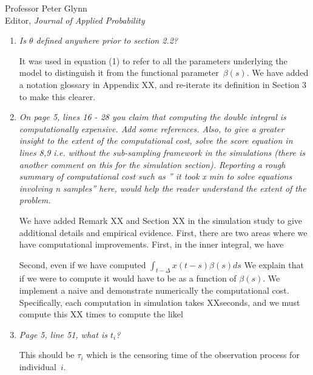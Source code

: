 \documentclass[11pt]{letter} %
\begin{document}
\begin{letter}{Professor
	Peter Glynn\\
	Editor, {\em Journal of Applied Probability}}
\begin{enumerate}
\vspace{5mm}
The key point raised on page 4 (now in Appendix XX), is that if $\epsilon(t)$ is not equivalently zero, your model assumes risk of an event at time $t$ depends on both the current and future measurements of the process ${\bf x}_i$. We argue this is not sensible since current risk should not depend on future risk and thus set $\epsilon(t) = 0$.
\vspace{5mm}

\item  {\it Is $\theta$ defined anywhere prior to section 2.2?}

\vspace{5mm}
It was used in equation (1) to refer to all the parameters underlying the model to distinguish it from the functional parameter~$\beta (s)$. We have added a notation glossary in Appendix XX, and re-iterate its definition in Section 3 to make this clearer.
\vspace{5mm}

\item {\it On page 5, lines 16 - 28 you claim that computing the double integral is computationally expensive. Add some references. Also, to give a greater insight to the extent of the computational cost, solve the score equation in lines 8,9 i.e. without the sub-sampling framework in the simulations (there is another comment on this for the simulation section). Reporting a rough summary of computational cost such as ” it took x min to solve equations involving n samples” here, would help the reader understand
the extent of the problem.}

\vspace{5mm}
We have added Remark XX and Section XX in the simulation study to give additional details and empirical evidence. First, there are two areas where we have computational improvements.  First, in the inner integral, we have

Second, even if we have computed $\int_{t-\Delta} x(t-s)\beta(s) ds$
We explain that if we were to compute it would have to be as a function of $\beta(s)$.  We implement a naive and demonstrate numerically the computational cost.  Specifically, each computation in simulation takes XXseconds, and we must compute this XX times to compute the likel
\vspace{5mm}

\item {\it Page 5, line 51, what is $t_i$?}

\vspace{5mm}
This should be $\tau_i$ which is the censoring time of the observation process for individual~$i$.
\vspace{5mm}


\end{enumerate}
\end{letter}
\end{document}
